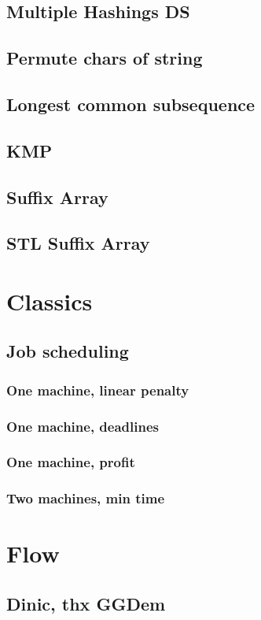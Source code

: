 \subsection{Multiple Hashings DS}
\subsection{Permute chars of string}
\subsection{Longest common subsequence}
\subsection{KMP}
\subsection{Suffix Array}
\subsection{STL Suffix Array}
\section{Classics}
\subsection{Job scheduling}
\subsubsection{One machine, linear penalty}
\subsubsection{One machine, deadlines}
\subsubsection{One machine, profit}
\subsubsection{Two machines, min time}

\section{Flow}
\subsection{Dinic, thx GGDem}

